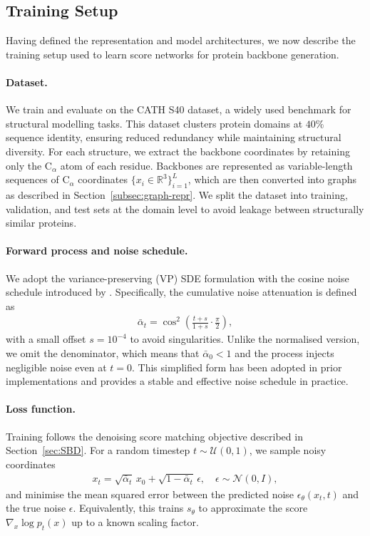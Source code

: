 \documentclass[a4paper,12pt]{article}
\begin{document}
\subsection{Training Setup}\label{subsec:training-setup}
Having defined the representation and model architectures, we now describe the training setup used to learn score networks for protein backbone generation.

\paragraph{Dataset.}
We train and evaluate on the CATH S40 dataset, a widely used benchmark for structural modelling tasks. 
This dataset clusters protein domains at \(40\%\) sequence identity, ensuring reduced redundancy while maintaining structural diversity. 
For each structure, we extract the backbone coordinates by retaining only the C\(_\alpha\) atom of each residue. 
Backbones are represented as variable-length sequences of C\(_\alpha\) coordinates \(\{x_i \in \mathbb{R}^3\}_{i=1}^L\), which are then converted into graphs as described in Section~\ref{subsec:graph-repr}. 
We split the dataset into training, validation, and test sets at the domain level to avoid leakage between structurally similar proteins.

\paragraph{Forward process and noise schedule.}
We adopt the variance-preserving (VP) SDE formulation with the cosine noise schedule introduced by \cite{nicholImprovedDenoisingDiffusion2021}. Specifically, the cumulative noise attenuation is defined as
\begin{align*}
    \bar \alpha_t = \cos^2\!\left(\frac{t+s}{1+s}\cdot \frac{\pi}{2}\right),
\end{align*}
with a small offset \(s = 10^{-4}\) to avoid singularities. Unlike the normalised version, we omit the denominator, which means that \(\bar\alpha_0 < 1\) and the process injects negligible noise even at \(t=0\). This simplified form has been adopted in prior implementations and provides a stable and effective noise schedule in practice. 

\paragraph{Loss function.}
Training follows the denoising score matching objective described in Section~\ref{sec:SBD}. For a random timestep \(t \sim \mathcal{U}(0,1)\), we sample noisy coordinates
\begin{align*}
    x_t = \sqrt{\bar\alpha_t}\,x_0 + \sqrt{1-\bar\alpha_t}\,\epsilon, \quad \epsilon \sim \mathcal{N}(0,I),
\end{align*}
and minimise the mean squared error between the predicted noise \(\epsilon_\theta(x_t, t)\) and the true noise \(\epsilon\). 
Equivalently, this trains \(s_\theta\) to approximate the score \(\nabla_x \log p_t(x)\) up to a known scaling factor.
\end{document}
